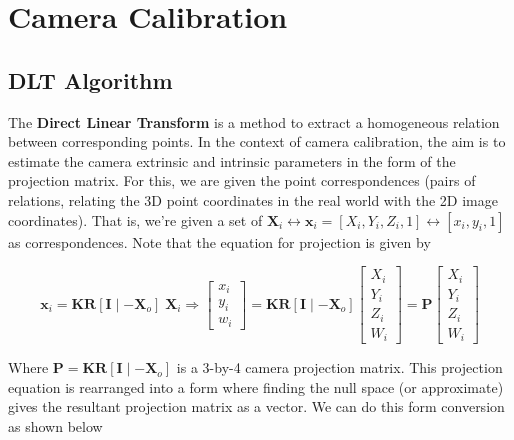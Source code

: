 \section{Camera Calibration}

\subsection{DLT Algorithm}

The \textbf{Direct Linear Transform} is a method to extract a homogeneous relation between corresponding points. In the context of camera calibration, the aim is to estimate the camera extrinsic and intrinsic parameters in the form of the projection matrix. For this, we are given the point correspondences (pairs of relations, relating the 3D point coordinates in the real world with the 2D image coordinates). That is, we're given a set of $\mathbf{X}_i \leftrightarrow \mathbf{x}_i = \left [ X_i, Y_i, Z_i, 1 \right ] \leftrightarrow \left [ x_i, y_i, 1 \right ]$ as correspondences. Note that the equation for projection is given by

\begin{equation}
    \mathbf{x}_i = \mathbf{K} \mathbf{R} \left [ \mathbf{I} \mid - \mathbf{X}_o \right ] \; \mathbf{X}_i
    \Rightarrow \begin{bmatrix}
    x_i \\ y_i \\ w_i
    \end{bmatrix} = \mathbf{K} \mathbf{R} \left [ \mathbf{I} \mid - \mathbf{X}_o \right ] \begin{bmatrix}
    X_i \\ Y_i \\ Z_i \\ W_i
    \end{bmatrix} = \mathbf{P} \begin{bmatrix}
    X_i \\ Y_i \\ Z_i \\ W_i
    \end{bmatrix}
    \label{eq:q3-cam-proj}
\end{equation}

Where $\mathbf{P} = \mathbf{K} \mathbf{R} \left [ \mathbf{I} \mid - \mathbf{X}_o \right ]$ is a 3-by-4 camera projection matrix. This projection equation is rearranged into a form where finding the null space (or approximate) gives the resultant projection matrix as a vector. We can do this form conversion as shown below

